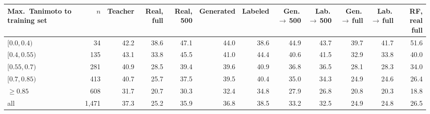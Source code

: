 \begin{tabular}{@{}lrrrrrrrrrrr@{}}
\toprule
Max.\ Tanimoto to training set & $n$ & Teacher & Real, full & Real, 500 & Generated & Labeled & Gen.\,$\rightarrow$\,500 & Lab.\,$\rightarrow$\,500 & Gen.\,$\rightarrow$\,full & Lab.\,$\rightarrow$\,full & RF, real full \\
\midrule
$[0.0, 0.4)$ & 34 & 42.2 & 38.6 & 47.1 & 44.0 & 38.6 & 44.9 & 43.7 & 39.7 & 41.7 & 51.6 \\
$[0.4, 0.55)$ & 135 & 43.1 & 33.8 & 45.5 & 41.0 & 44.4 & 40.6 & 41.5 & 32.9 & 33.8 & 40.0 \\
$[0.55, 0.7)$ & 281 & 40.9 & 28.5 & 39.4 & 39.6 & 40.9 & 36.8 & 36.5 & 28.1 & 28.3 & 34.0 \\
$[0.7, 0.85)$ & 413 & 40.7 & 25.7 & 37.5 & 39.5 & 40.4 & 35.0 & 34.3 & 24.9 & 24.6 & 26.4 \\
$\geq 0.85$ & 608 & 31.7 & 20.7 & 30.3 & 32.4 & 34.8 & 27.9 & 26.8 & 20.8 & 20.3 & 18.8 \\
all & 1,471 & 37.3 & 25.2 & 35.9 & 36.8 & 38.5 & 33.2 & 32.5 & 24.9 & 24.8 & 26.5 \\
\bottomrule
\end{tabular}
